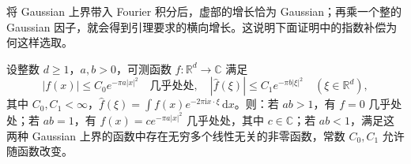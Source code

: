 将 Gaussian 上界带入 Fourier 积分后，虚部的增长恰为 Gaussian；再乘一个整的 Gaussian 因子，就会得到引理要求的横向增长。这说明下面证明中的指数补偿为何这样选取。

\begin{theorem}[Hardy]\label{b2:thm:20-hardy}
设整数 \(d\geq1\)，\(a,b>0\)，可测函数 \(f:\mathbb R^d\to\mathbb C\) 满足
\[
 |f(x)|\leq C_0e^{-\pi a|x|^2}\quad\text{几乎处处},
 \quad |\widehat f(\xi)|\leq C_1e^{-\pi b|\xi|^2}
 \quad(\xi\in\mathbb R^d),
\]
其中 \(C_0,C_1<\infty\)，\(\widehat f(\xi)=\int f(x)e^{-2\pi\mathrm i x\cdot\xi}\,\mathrm dx\)。则：若 \(ab>1\)，有 \(f=0\) 几乎处处；若 \(ab=1\)，有 \(f(x)=c e^{-\pi a|x|^2}\) 几乎处处，其中 \(c\in\mathbb C\)；若 \(ab<1\)，满足这两种 Gaussian 上界的函数中存在无穷多个线性无关的非零函数，常数 \(C_0,C_1\) 允许随函数改变。
\end{theorem}
